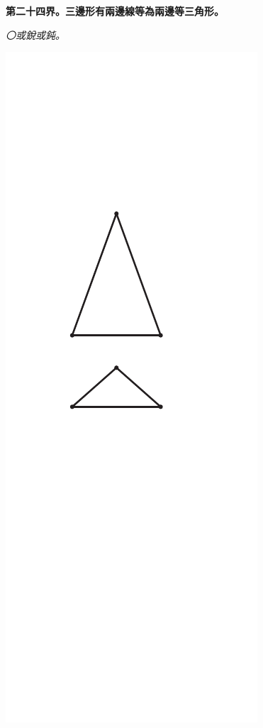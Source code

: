 \documentclass[12pt,b5paper,landscape]{article}
\newcommand{\ccom}[1]{{\footnotesize \emph{〇#1}}}
\newcommand{\cthm}[1]{{
\vspace{8pt}

\bfseries #1}}
\begin{document}
\begin{multicols}{2}
\cthm{第二十四界。三邊形有兩邊線等為兩邊等三角形。}\ccom{或銳或鈍。}
\begin{center}
\includegraphics[angle=90]{eu15}
\end{center}


\end{multicols}
\end{document}

